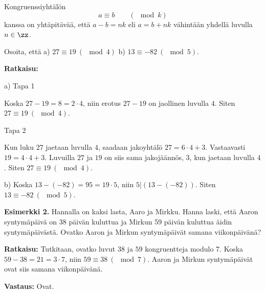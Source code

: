 
Kongruenssiyhtälön
\[
a\equiv b\qquad (\mod k)
\]
kanssa on yhtäpitävää, että $a-b=nk$ eli $a=b+nk$ vähintään yhdellä luvulla $n\in \zz$.


\begin{esimerkki}
Osoita, että a) $27 \equiv 19 \ (\mod 4)$ b) $13 \equiv -82 \ (\mod 5)$.

{\bf Ratkaisu:}

a) Tapa 1

Koska $27 - 19 = 8 = 2\cdot 4$, niin erotus $27-19$ on jaollinen luvulla $4$. Siten $27 \equiv 19 \ (\mod 4)$.

Tapa 2

Kun luku $27$ jaetaan luvulla $4$, saadaan jakoyhtälö $27 = 6 \cdot 4 + 3$. Vastaavasti $19 = 4 \cdot 4 + 3$. Luvuilla $27$ ja $19$ on siis sama jakojäännös, $3$, kun jaetaan luvulla $4$. Siten $27 \equiv 19\ (\mod 4)$.

b) Koska $13 - (-82) = 95 = 19 \cdot 5$, niin $5 | (13 - (-82))$. Siten $13 \equiv -82 \ (\mod 5)$.


{\bf Esimerkki 2.}
Hannalla on kaksi lasta, Aaro ja Mirkku. Hanna laski, että Aaron syntymäpäivä on 38 päivän kuluttua  ja Mirkun 59 päivän kuluttua äidin syntymäpäivästä. Ovatko Aaron ja Mirkun syntymäpäivät samana viikonpäivänä?

{\bf Ratkaisu:}
Tutkitaan, ovatko luvut $38$ ja $59$ kongruentteja modulo $7$. Koska $59 - 38 = 21 = 3\cdot 7$, niin $59 \equiv 38\ (\mod 7)$. Aaron ja Mirkun syntymäpäivät ovat siis  samana viikonpäivänä.

{\bf Vastaus:} Ovat.
\end{esimerkki}

